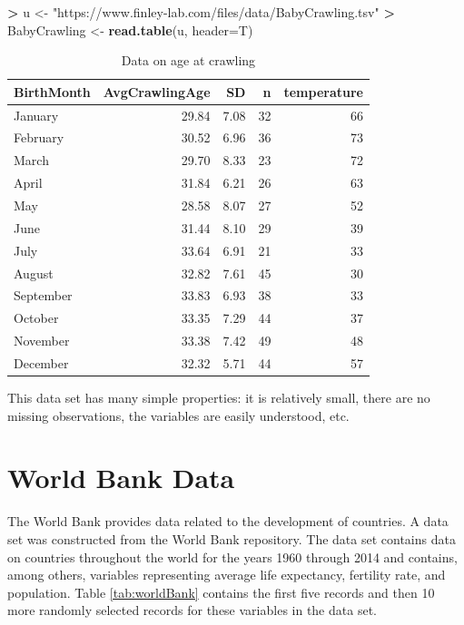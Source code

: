 \documentclass[
]{krantz}
\makeatletter
\newenvironment{Shaded}{\begin{snugshade}}{\end{snugshade}}
\newcommand{\DataTypeTok}[1]{\textcolor[rgb]{0.27,0.27,0.27}{#1}}
\newcommand{\KeywordTok}[1]{\textcolor[rgb]{0.27,0.27,0.27}{\textbf{#1}}}
\newcommand{\NormalTok}[1]{#1}
\newcommand{\OperatorTok}[1]{\textcolor[rgb]{0.43,0.43,0.43}{\textbf{#1}}}
\newcommand{\StringTok}[1]{\textcolor[rgb]{0.5,0.5,0.5}{#1}}
\newenvironment{kframe}{%
\medskip{}
\setlength{\fboxsep}{.8em}
 \def\at@end@of@kframe{}%
 \ifinner\ifhmode%
  \def\at@end@of@kframe{\end{minipage}}%
  \begin{minipage}{\columnwidth}%
 \fi\fi%
 \def\FrameCommand##1{\hskip\@totalleftmargin \hskip-\fboxsep
 \colorbox{shadecolor}{##1}\hskip-\fboxsep
     \hskip-\linewidth \hskip-\@totalleftmargin \hskip\columnwidth}%
 \MakeFramed {\advance\hsize-\width
   \@totalleftmargin\z@ \linewidth\hsize
   \@setminipage}}%
 {\par\unskip\endMakeFramed%
 \at@end@of@kframe}
\renewenvironment{Shaded}{\begin{kframe}}{\end{kframe}}
\makeatother
\begin{document}
\begin{Shaded}
\begin{Highlighting}[]
\OperatorTok{\textgreater{}}\StringTok{ }\NormalTok{u \textless{}{-}}\StringTok{ "https://www.finley{-}lab.com/files/data/BabyCrawling.tsv"}
\OperatorTok{\textgreater{}}\StringTok{ }\NormalTok{BabyCrawling \textless{}{-}}\StringTok{ }\KeywordTok{read.table}\NormalTok{(u, }\DataTypeTok{header=}\NormalTok{T)}
\end{Highlighting}
\end{Shaded}

\begin{table}[t]

\caption{\label{tab:crawling}Data on age at crawling}
\centering
\begin{tabular}{lrrrr}
\toprule
BirthMonth & AvgCrawlingAge & SD & n & temperature\\
\midrule
January & 29.84 & 7.08 & 32 & 66\\
February & 30.52 & 6.96 & 36 & 73\\
March & 29.70 & 8.33 & 23 & 72\\
April & 31.84 & 6.21 & 26 & 63\\
May & 28.58 & 8.07 & 27 & 52\\
\addlinespace
June & 31.44 & 8.10 & 29 & 39\\
July & 33.64 & 6.91 & 21 & 33\\
August & 32.82 & 7.61 & 45 & 30\\
September & 33.83 & 6.93 & 38 & 33\\
October & 33.35 & 7.29 & 44 & 37\\
\addlinespace
November & 33.38 & 7.42 & 49 & 48\\
December & 32.32 & 5.71 & 44 & 57\\
\bottomrule
\end{tabular}
\end{table}

This data set has many simple properties: it is relatively small, there are no missing observations, the variables are easily understood, etc.

\hypertarget{world-bank-data}{%
\section{World Bank Data}\label{world-bank-data}}

The World Bank provides data related to the development of countries. A data set was constructed from the World Bank repository. The data set contains data on countries throughout the world for the years 1960 through 2014 and contains, among others, variables representing average life expectancy, fertility rate, and population. Table \ref{tab:worldBank} contains the first five records and then 10 more randomly selected records for these variables in the data set.
\end{document}
